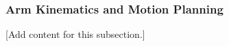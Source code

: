 
\subsubsection{Arm Kinematics and Motion Planning}
\label{subsubsec:design_2_5_5_arm_kinematics_motion_planning}

[Add content for this subsection.]

